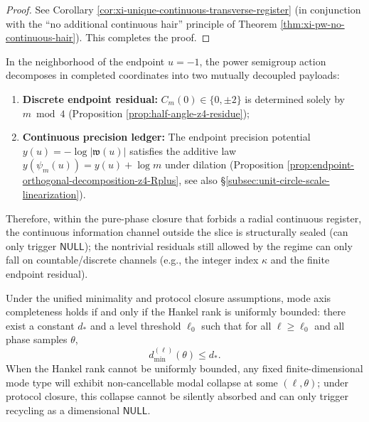 \begin{proof}
See Corollary \ref{cor:xi-unique-continuous-transverse-register} (in conjunction with the ``no additional continuous hair'' principle of Theorem \ref{thm:xi-pw-no-continuous-hair}). This completes the proof.
\end{proof}

\begin{corollary}\label{cor:discussion-endpoint-discrete-vs-continuous}
In the neighborhood of the endpoint \(u=-1\), the power semigroup action decomposes in completed coordinates into two mutually decoupled payloads:
\begin{enumerate}
  \item \textbf{Discrete endpoint residual:} \(C_m(0)\in\{0,\pm 2\}\) is determined solely by \(m\bmod 4\) (Proposition \ref{prop:half-angle-z4-residue});
  \item \textbf{Continuous precision ledger:} The endpoint precision potential \(y(u)=-\log|\mathfrak{w}(u)|\) satisfies the additive law \(y(\psi_m(u))=y(u)+\log m\) under dilation (Proposition \ref{prop:endpoint-orthogonal-decomposition-z4-Rplus}, see also \S\ref{subsec:unit-circle-scale-linearization}).
\end{enumerate}
Therefore, within the pure-phase closure that forbids a radial continuous register, the continuous information channel outside the slice is structurally sealed (can only trigger \(\mathsf{NULL}\)); the nontrivial residuals still allowed by the regime can only fall on countable/discrete channels (e.g., the integer index \(\kappa\) and the finite endpoint residual).
\end{corollary}

\begin{theorem}\label{thm:discussion-dimensional-null-trigger}
Under the unified minimality and protocol closure assumptions, mode axis completeness holds if and only if the Hankel rank is uniformly bounded:
there exist a constant \(d_\ast\) and a level threshold \(\ell_0\) such that for all \(\ell\ge \ell_0\) and all phase samples \(\theta\),
\[
d^{(\ell)}_{\min}(\theta)\le d_\ast.
\]
When the Hankel rank cannot be uniformly bounded, any fixed finite-dimensional mode type will exhibit non-cancellable modal collapse at some \((\ell,\theta)\); under protocol closure, this collapse cannot be silently absorbed and can only trigger recycling as a dimensional \(\mathsf{NULL}\).
\end{theorem}

